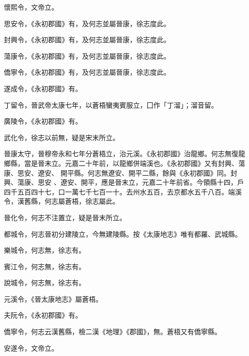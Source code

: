 \begin{pinyinscope}
 懷熙令，文帝立。



 思安令，《永初郡國》有，及何志並屬晉康，徐志度此。



 封興令，《永初郡國》有，及何志並屬晉康，徐志度此。



 蕩康令，《永初郡國》有，及何志並屬晉康，徐志度此。



 僑寧令，《永初郡國》有，及何志並屬晉康，徐志度此。



 遂成令，《永初郡國》有。



 丁留令，晉武帝太康七年，以蒼梧蠻夷賓服立，囗作「丁溜」；溜音留。



 廣陵令，《永初郡國》有。



 武化令，徐志以前無，疑是宋末所立。


晉康太守，晉穆帝永和七年分蒼梧立，治元溪。《永初郡國》治龍鄉。何志無復龍鄉縣，當是晉末立。元嘉二十年前，以龍鄉併端溪也。《永初郡國》又有封興、蕩康、思安、遼安、
 開平縣。何志無遼安、開平二縣，餘與《永初郡國》同。封興、蕩康、思安
 、遼安、開平，應是晉末立，元嘉二十年前省。今領縣十四，戶四千五百四十七，口一萬七千七百一十。去州水五百，去京都水五千八百。端溪令，漢舊縣，何志屬蒼梧，徐志屬此。



 晉化令，何志不注置立，疑是晉末所立。



 都城令，何志晉初分建陵立，今無建陵縣。按《太康地志》唯有都羅、武城縣。



 樂城令，何志無，徐志有。



 賓江令，何志無，徐志有。



 說城令，何志無，徐志有。



 元溪令，《晉太康地志》屬蒼梧。



 夫阮令，《永初郡國》有。



 僑寧令，何志云漢舊縣，檢二漢《地理》《郡國》，無。蒼梧又有僑寧縣。



 安遂令，文帝立。




\end{pinyinscope}
